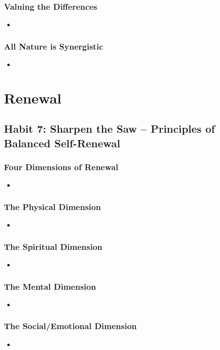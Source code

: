 \documentclass[11pt]{article}
\begin{document}
\subsubsection{Valuing the Differences}
\begin{itemize}
\item 
\end{itemize}
\subsubsection{All Nature is Synergistic}
\begin{itemize}
\item 
\end{itemize}
\section{Renewal}
\subsection{Habit 7: Sharpen the Saw -- Principles of Balanced Self-Renewal}
\subsubsection{Four Dimensions of Renewal}
\begin{itemize}
\item 
\end{itemize}
\subsubsection{The Physical Dimension}
\begin{itemize}
\item 
\end{itemize}
\subsubsection{The Spiritual Dimension}
\begin{itemize}
\item 
\end{itemize}
\subsubsection{The Mental Dimension}
\begin{itemize}
\item 
\end{itemize}
\subsubsection{The Social/Emotional Dimension}
\begin{itemize}
\item 
\end{itemize}
\end{document}
